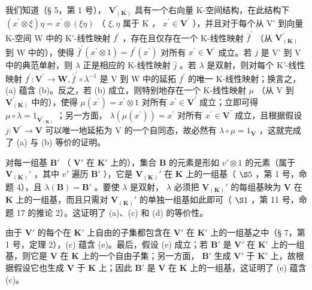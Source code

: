 我们知道（§ 5，第 1 号）， \(\mathbf{V}_{(\mathbf{K})}^{\prime}\) 具有一个右向量 K-空间结构，在此结构下 \((x^{\prime} \otimes \xi)\eta = x^{\prime} \otimes (\xi\eta)\) （ \(\xi, \eta\) 属于 K ， \(x^{\prime} \in \mathbf{V}^{\prime}\) ），并且对于每个从 V' 到向量 K-空间 W 中的 K'-线性映射 \(f^{\prime}\) ，存在且仅存在一个 K-线性映射 \(\bar{f}^{\prime}\) （从 \(\mathbf{V}_{(\mathbf{K})}^{\prime}\) 到 W 中的），使得 \(\bar{f}^{\prime}(x^{\prime} \otimes 1) = f^{\prime}(x^{\prime})\) 对所有 \(x^{\prime} \in \mathbf{V}^{\prime}\) 成立。若 \(j\) 是 V' 到 V 中的典范单射，则 \(\lambda\) 正是相应的 K-线性映射 \(\bar{j}\) 。若 \(\lambda\) 是双射，则对每个 K'-线性映射 \(f^{\prime}: \mathbf{V}^{\prime} \to \mathbf{W}, \bar{f}^{\prime} \circ \lambda^{-1}\) 是 V 到 W 中的延拓 \(f^{\prime}\) 的唯一 K-线性映射；换言之，(a) 蕴含 (b)。反之，若 (b) 成立，则特别地存在一个 K-线性映射 \(\mu\) （从 V 到 \(\mathbf{V}_{(\mathbf{K})}^{\prime}\) 中的），使得 \(\mu(x^{\prime}) = x^{\prime} \otimes 1\) 对所有 \(x^{\prime} \in \mathbf{V}^{\prime}\) 成立；立即可得 \(\mu \circ \lambda = 1_{\mathbf{V}_{(\mathbf{K})}^{\prime}}\) ；另一方面， \(\lambda(\mu(x^{\prime})) = x^{\prime}\) 对所有 \(x^{\prime} \in \mathbf{V}^{\prime}\) 成立，且根据假设 \(j: \mathbf{V}^{\prime} \to \mathbf{V}\) 可以唯一地延拓为 V 的一个自同态，故必然有 \(\lambda \circ \mu = 1_{\mathbf{V}}\) ，这就完成了 (a) 与 (b) 等价的证明。

对每一组基 \(\mathbf{B}'\) （ \(\mathbf{V}'\) 在 \(\mathbf{K}'\) 上的），集合 \(\mathbf{B}\) 的元素是形如 \(v' \otimes 1\) 的元素（属于 \(\mathbf{V}_{(\mathbf{K})}'\) ，其中 \(v'\) 遍历 \(\mathbf{B}'\) ），它是 \(\mathbf{V}_{(\mathbf{K})}'\) 在 \(\mathbf{K}\) 上的一组基（ \(\S 5\) ，第 1 号，命题 4），且 \(\lambda(\mathbf{B}) = \mathbf{B}'\) 。要使 \(\lambda\) 是双射， \(\lambda\) 必须把 \(\mathbf{V}_{(\mathbf{K})}'\) 的每组基映为 \(\mathbf{V}\) 在 \(\mathbf{K}\) 上的一组基，而且只需对 \(\mathbf{V}_{(\mathbf{K})}'\) 的单独一组基如此即可（ \(\S 1\) ，第 11 号，命题 17 的推论 2）。这证明了 (a)、(c) 和 (d) 的等价性。

由于 \(\mathbf{V}'\) 的每个在 \(\mathbf{K}'\) 上自由的子集都包含在 \(\mathbf{V}'\) 在 \(\mathbf{K}'\) 上的一组基之中（§ 7，第 1 号，定理 2），(c) 蕴含 (e)。最后，假设 (e) 成立；若 \(\mathbf{B}'\) 是 \(\mathbf{V}'\) 在 \(\mathbf{K}'\) 上的一组基，则它是 \(\mathbf{V}\) 在 \(\mathbf{K}\) 上的一个自由子集；另一方面， \(\mathbf{B}'\) 生成 \(\mathbf{V}'\) 于 \(\mathbf{K}'\) 上，故根据假设它也生成 \(\mathbf{V}\) 于 \(\mathbf{K}\) 上；因此 \(\mathbf{B}'\) 是 \(\mathbf{V}\) 在 \(\mathbf{K}\) 上的一组基，这证明了 (e) 蕴含 (c)。

